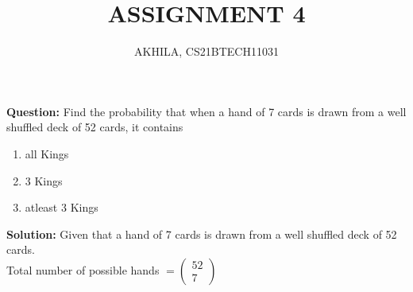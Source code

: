 \documentclass[journal,12pt,twocolumn]{IEEEtran}
\newcommand{\myvec}[1]{\ensuremath{\begin{pmatrix}#1\end{pmatrix}}}
\newcommand{\question}{\noindent \textbf{Question: }}
\newcommand{\solution}{\noindent \textbf{Solution: }}
\begin{document}
\title{ASSIGNMENT 4}
\author{AKHILA, CS21BTECH11031}

\maketitle
\question
Find the probability that when a hand of 7 cards is drawn from a well
shuffled deck of 52 cards, it contains
    \begin{enumerate}[label=(\roman{enumi})]
		\item all Kings
		\item 3 Kings
		\item atleast 3 Kings
    \end{enumerate}
\solution
Given that a hand of 7 cards is drawn from a well shuffled deck of 52 cards.\\
Total number of possible hands $=\myvec{52 \\ 7}$\\
\end{document}
